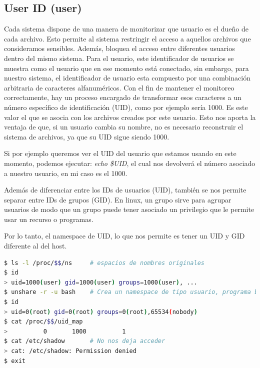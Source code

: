 \documentclass[12pt]{article}
\begin{document}
	
	\pagebreak
	\subsection{User ID (user)}
	\par \noindent Cada sistema dispone de una manera de monitorizar que usuario es el dueño de cada archivo. Esto permite al sistema restringir el acceso a aquellos archivos que consideramos sensibles. Además, bloquea el acceso entre diferentes usuarios dentro del mismo sistema. Para el usuario, este identificador de usuarios se muestra como el usuario que en ese momento está conectado, sin embargo, para nuestro sistema, el identificador de usuario esta compuesto por una combinación arbitraria de caracteres alfanuméricos. Con el fin de mantener el monitoreo correctamente, hay un proceso encargado de transformar esos caracteres a un número específico de identificación (UID), como por ejemplo sería 1000. Es este valor el que se asocia con los archivos creados por este usuario. Esto nos aporta la ventaja de que, si un usuario cambia su nombre, no es necesario reconstruir el sistema de archivos, ya que su UID sigue siendo 1000.\\
	
	\par \noindent Si por ejemplo queremos ver el UID del usuario que estamos usando en este momento, podemos ejecutar: \textit{echo \$UID}, el cual nos devolverá el número asociado a nuestro usuario, en mi caso es el 1000.\\
	
	\par \noindent Además de diferenciar entre los IDs de usuarios (UID), también se nos permite separar entre IDs de grupos (GID). En linux, un grupo sirve para agrupar usuarios de modo que un grupo puede tener asociado un privilegio que le permite usar un recurso o programas.\\
	
	\par \noindent Por lo tanto, el namespace de UID, lo que nos permite es tener un UID y GID diferente al del host. 
	
	\begin{lstlisting}[language=bash, caption=Ejemplo de uso UID namespace]
$ ls -l /proc/$$/ns		# espacios de nombres originales
$ id
> uid=1000(user) gid=1000(user) groups=1000(user), ...
$ unshare -r -u bash	# Crea un namespace de tipo usuario, programa bash
$ id
> uid=0(root) gid=0(root) groups=0(root),65534(nobody)
$ cat /proc/$$/uid_map
>          0       1000          1
$ cat /etc/shadow		# No nos deja acceder
> cat: /etc/shadow: Permission denied
$ exit
	\end{lstlisting}
	
\end{document}
